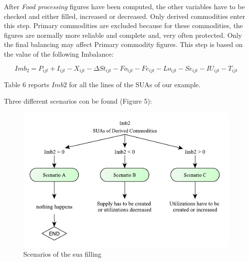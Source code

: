 \documentclass[]{article}
\begin{document}
After \emph{Food processing} figures have been computed, the other
variables have to be checked and either filled, increased or decreased.
Only derived commodities enter this step. Primary commodities are
excluded because for these commodities, the figures are normally more
reliable and complete and, very often protected. Only the final
balancing may affect Primary commodity figures. This step is based on
the value of the following Imbalance:

\begin{equation}
\label{imbalance2}
Imb_{2} = P_{ijt} + I_{ijt} - X_{ijt} - \Delta St_{ijt} - Fo_{ijt} - Fe_{ijt} - Lo_{ijt} - Se_{ijt} - IU_{ijt} - T_{ijt}
\end{equation}

Table 6 reports \(Imb2\) for all the lines of the SUAs of our example.

Three different scenarios con be found (Figure 5):

\begin{figure}

{\centering \includegraphics[width=0.8\linewidth]{images/05_ScenariosFilling} 

}

\caption{\label{fig:f5}Scenarios of the sua filling}\label{fig:f5}
\end{figure}
\end{document}

